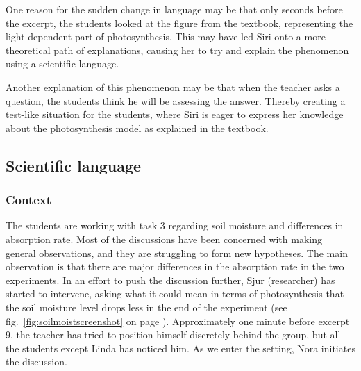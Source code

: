 One reason for the sudden change in language may be that only seconds before the excerpt, the students looked at the figure from the textbook, representing the light-dependent part of photosynthesis. This may have led Siri onto a more theoretical path of explanations, causing her to try and explain the phenomenon using a scientific language. 

Another explanation of this phenomenon may be that when the teacher asks a question, the students think he will be assessing the answer. Thereby creating a test-like situation for the students, where Siri is eager to express her knowledge about the photosynthesis model as explained in the textbook. 

\subsection{Scientific language}
\subsubsection*{Context}
The students are working with task 3 regarding soil moisture and differences in absorption rate. Most of the discussions have been concerned with making general observations, and they are struggling to form new hypotheses. The main observation is that there are major differences in the absorption rate in the two experiments. In an effort to push the discussion further, Sjur (researcher) has started to intervene, asking what it could mean in terms of photosynthesis that the soil moisture level drops less in the end of the experiment (see fig.~\ref{fig:soilmoistscreenshot} on page \pageref{fig:soilmoistscreenshot}). Approximately one minute before excerpt 9, the teacher has tried to position himself discretely behind the group, but all the students except Linda has noticed him. As we enter the setting, Nora initiates the discussion.

